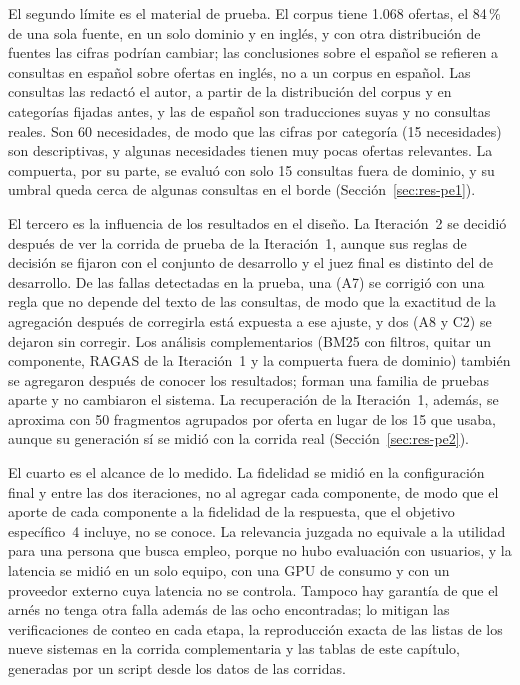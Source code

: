 El segundo límite es el material de prueba. El corpus tiene 1.068 ofertas, el 84\,\% de una sola fuente, en un solo dominio y en inglés, y con otra distribución de fuentes las cifras podrían cambiar; las conclusiones sobre el español se refieren a consultas en español sobre ofertas en inglés, no a un corpus en español. Las consultas las redactó el autor, a partir de la distribución del corpus y en categorías fijadas antes, y las de español son traducciones suyas y no consultas reales. Son 60 necesidades, de modo que las cifras por categoría (15 necesidades) son descriptivas, y algunas necesidades tienen muy pocas ofertas relevantes. La compuerta, por su parte, se evaluó con solo 15 consultas fuera de dominio, y su umbral queda cerca de algunas consultas en el borde (Sección~\ref{sec:res-pe1}).

El tercero es la influencia de los resultados en el diseño. La Iteración~2 se decidió después de ver la corrida de prueba de la Iteración~1, aunque sus reglas de decisión se fijaron con el conjunto de desarrollo y el juez final es distinto del de desarrollo. De las fallas detectadas en la prueba, una (A7) se corrigió con una regla que no depende del texto de las consultas, de modo que la exactitud de la agregación después de corregirla está expuesta a ese ajuste, y dos (A8 y C2) se dejaron sin corregir. Los análisis complementarios (BM25 con filtros, quitar un componente, RAGAS de la Iteración~1 y la compuerta fuera de dominio) también se agregaron después de conocer los resultados; forman una familia de pruebas aparte y no cambiaron el sistema. La recuperación de la Iteración~1, además, se aproxima con 50 fragmentos agrupados por oferta en lugar de los 15 que usaba, aunque su generación sí se midió con la corrida real (Sección~\ref{sec:res-pe2}).

El cuarto es el alcance de lo medido. La fidelidad se midió en la configuración final y entre las dos iteraciones, no al agregar cada componente, de modo que el aporte de cada componente a la fidelidad de la respuesta, que el objetivo específico~4 incluye, no se conoce. La relevancia juzgada no equivale a la utilidad para una persona que busca empleo, porque no hubo evaluación con usuarios, y la latencia se midió en un solo equipo, con una GPU de consumo y con un proveedor externo cuya latencia no se controla. Tampoco hay garantía de que el arnés no tenga otra falla además de las ocho encontradas; lo mitigan las verificaciones de conteo en cada etapa, la reproducción exacta de las listas de los nueve sistemas en la corrida complementaria y las tablas de este capítulo, generadas por un script desde los datos de las corridas.
